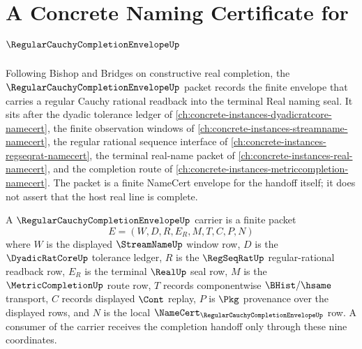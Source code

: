 \chapter{A Concrete Naming Certificate for $\RegularCauchyCompletionEnvelopeUp$}
\label{ch:concrete-instances-regular-cauchy-completion-envelope-namecert}

Following Bishop and Bridges on constructive real completion, the $\RegularCauchyCompletionEnvelopeUp$ packet records the finite envelope that carries a regular Cauchy rational readback into the terminal Real naming seal. It sits after the dyadic tolerance ledger of \autoref{ch:concrete-instances-dyadicratcore-namecert}, the finite observation windows of \autoref{ch:concrete-instances-streamname-namecert}, the regular rational sequence interface of \autoref{ch:concrete-instances-regseqrat-namecert}, the terminal real-name packet of \autoref{ch:concrete-instances-real-namecert}, and the completion route of \autoref{ch:concrete-instances-metriccompletion-namecert}. The packet is a finite NameCert envelope for the handoff itself; it does not assert that the host real line is complete.

\begin{definition}
\label{def:regular-cauchy-completion-envelope-carrier}
A $\RegularCauchyCompletionEnvelopeUp$ carrier is a finite packet
$$
E=(W,D,R,E_R,M,T,C,P,N)
$$
where $W$ is the displayed $\StreamNameUp$ window row, $D$ is the $\DyadicRatCoreUp$ tolerance ledger, $R$ is the $\RegSeqRatUp$ regular-rational readback row, $E_R$ is the terminal $\RealUp$ seal row, $M$ is the $\MetricCompletionUp$ route row, $T$ records componentwise $\BHist/\hsame$ transport, $C$ records displayed $\Cont$ replay, $P$ is $\Pkg$ provenance over the displayed rows, and $N$ is the local $\NameCert_{\RegularCauchyCompletionEnvelopeUp}$ row. A consumer of the carrier receives the completion handoff only through these nine coordinates.
\end{definition}

